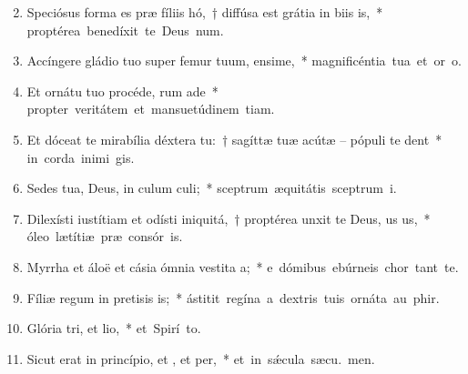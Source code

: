 \begin{flushleft}
\begin{enumerate}[leftmargin=*]
\setcounter{enumi}{1}

\item Speciósus forma es præ fíliis hó,~† diffúsa est grátia in biis is,~* \mbox{proptérea benedíxit te Deus  num.}

\item Accíngere gládio tuo super femur tuum, ensime,~* \mbox{magnificéntia tua et or o.}

\item Et ornátu tuo procéde, rum ade~* \mbox{propter veritátem et mansuetúdinem  tiam.}

\item Et dóceat te mirabília déxtera tu:~† sagíttæ tuæ acútæ – pópuli  te dent~* \mbox{in corda inimi gis.}

\item Sedes tua, Deus, in culum culi;~* \mbox{sceptrum æquitátis sceptrum  i.}

\item Dilexísti iustítiam et odísti iniquitá,~† proptérea unxit te Deus, us us,~* \mbox{óleo lætítiæ præ consór is.}

\item Myrrha et áloë et cásia ómnia vestita a;~* \mbox{e dómibus ebúrneis chor tant te.}

\item Fíliæ regum in pretisis is;~* \mbox{ástitit regína a dextris tuis ornáta au  phir.}

\item Glória tri, et lio,~* \mbox{et Spirí to.}

\item Sicut erat in princípio, et , et per,~* \mbox{et in s\'{\ae}cula sæcu. men.}

\end{enumerate}
\end{flushleft}

